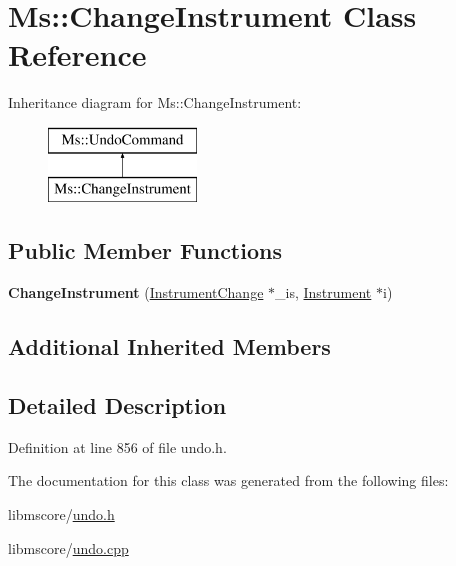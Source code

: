 \hypertarget{class_ms_1_1_change_instrument}{}\section{Ms\+:\+:Change\+Instrument Class Reference}
\label{class_ms_1_1_change_instrument}
Inheritance diagram for Ms\+:\+:Change\+Instrument\+:\begin{figure}[H]
\begin{center}
\leavevmode
\includegraphics[height=2.000000cm]{class_ms_1_1_change_instrument}
\end{center}
\end{figure}
\subsection*{Public Member Functions}
\begin{DoxyCompactItemize}
\item 
\mbox{\label{class_ms_1_1_change_instrument_a9575445d0529772cbc6f9dd2b371ebde}} 
{\bfseries Change\+Instrument} (\hyperlink{class_ms_1_1_instrument_change}{Instrument\+Change} $\ast$\+\_\+is, \hyperlink{class_ms_1_1_instrument}{Instrument} $\ast$i)
\end{DoxyCompactItemize}
\subsection*{Additional Inherited Members}


\subsection{Detailed Description}


Definition at line 856 of file undo.\+h.



The documentation for this class was generated from the following files\+:\begin{DoxyCompactItemize}
\item 
libmscore/\hyperlink{undo_8h}{undo.\+h}\item 
libmscore/\hyperlink{undo_8cpp}{undo.\+cpp}\end{DoxyCompactItemize}
